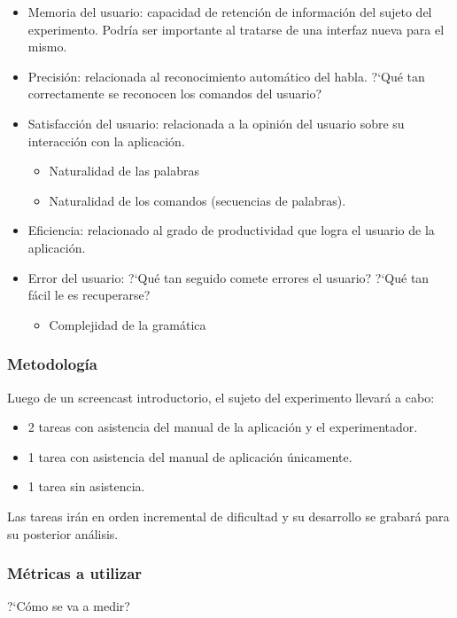 \begin{itemize}
    \item Memoria del usuario: capacidad de retenci\'on de informaci\'on del sujeto del experimento. Podr\'ia ser importante al tratarse de una interfaz nueva para el mismo. 
    \item Precisi\'on: relacionada al reconocimiento autom\'atico del habla. {?`}Qu\'e tan correctamente se reconocen los comandos del usuario?
    \item Satisfacci\'on del usuario: relacionada a la opini\'on del usuario sobre su interacci\'on con la aplicaci\'on.
    \begin{itemize}
        \item Naturalidad de las palabras
        \item Naturalidad de los comandos (secuencias de palabras).
    \end{itemize}
    \item Eficiencia: relacionado al grado de productividad que logra el usuario de la aplicaci\'on.
    \item Error del usuario: {?`}Qu\'e tan seguido comete errores el usuario? {?`}Qu\'e tan f\'acil le es recuperarse?
    \begin{itemize}
        \item Complejidad de la gram\'atica
    \end{itemize}
\end{itemize}

\subsubsection{Metodolog\'ia}
Luego de un screencast introductorio, el sujeto del experimento llevar\'a a cabo:

\begin{itemize}
    \item 2 tareas con asistencia del manual de la aplicaci\'on y el experimentador.
    \item 1 tarea con asistencia del manual de aplicaci\'on \'unicamente.
    \item 1 tarea sin asistencia.
\end{itemize}
Las tareas ir\'an en orden incremental de dificultad y su desarrollo se grabar\'a para su posterior an\'alisis.

\subsubsection{M\'etricas a utilizar}
{?`}C\'omo se va a medir?

